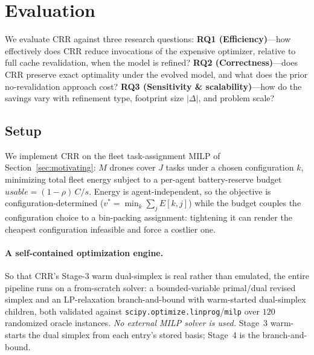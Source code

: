 
\section{Evaluation}
\label{sec:evaluation}

We evaluate CRR against three research questions:
\textbf{RQ1 (Efficiency)}---how effectively does CRR reduce invocations of the
expensive optimizer, relative to full cache revalidation, when the model is
refined? \textbf{RQ2 (Correctness)}---does CRR preserve exact optimality under the
evolved model, and what does the prior no-revalidation approach cost?
\textbf{RQ3 (Sensitivity \& scalability)}---how do the savings vary with
refinement type, footprint size $|\Delta|$, and problem scale?

\subsection{Setup}
We implement CRR on the fleet task-assignment MILP of Section~\ref{sec:motivating}:
$M$ drones cover $J$ tasks under a chosen configuration $k$, minimizing total
fleet energy subject to a per-agent battery-reserve budget
$\mathit{usable}=(1-\rho)\,C/s$. Energy is agent-independent, so the objective is
configuration-determined ($v^\ast=\min_k\sum_j E[k,j]$) while the budget couples
the configuration choice to a bin-packing assignment: tightening it can render the
cheapest configuration infeasible and force a costlier one.

\paragraph{A self-contained optimization engine.} So that CRR's Stage-3 warm
dual-simplex is real rather than emulated, the entire pipeline runs on a
from-scratch solver: a bounded-variable primal/dual revised simplex and an
LP-relaxation branch-and-bound with warm-started dual-simplex children, both
validated against \texttt{scipy.optimize.linprog}/\texttt{milp} over $120$
randomized oracle instances. \emph{No external MILP solver is used.} Stage~3
warm-starts the dual simplex from each entry's stored basis; Stage~4 is the
branch-and-bound.

